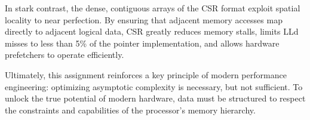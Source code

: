 \documentclass[11pt]{article}
\begin{document}
In stark contrast, the dense, contiguous arrays of the CSR format exploit spatial locality to near perfection. By ensuring that adjacent memory accesses map directly to adjacent logical data, CSR greatly reduces memory stalls, limits LLd misses to less than 5\% of the pointer implementation, and allows hardware prefetchers to operate efficiently. 

Ultimately, this assignment reinforces a key principle of modern performance engineering: optimizing asymptotic complexity is necessary, but not sufficient. To unlock the true potential of modern hardware, data must be structured to respect the constraints and capabilities of the processor's memory hierarchy.
\end{document}
